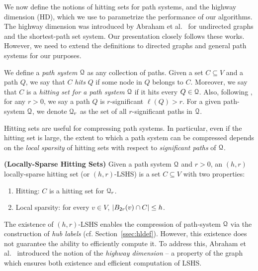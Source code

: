 
We now define the notions of hitting sets for path systems, and the highway dimension (HD), which we use to parametrize the performance of our algorithms. The highway dimension was introduced by Abraham et al.~\cite{highway2013,highway2010} for undirected graphs and the shortest-path set system. 
Our presentation closely follows these works.
However, we need to extend the definitions to directed graphs and general path systems for our purposes. 

We define a \emph{path system} $\calQ$ as any collection of paths.
Given a set $C\subseteq V$ and a path $Q$, we say that $C$ \emph{hits} $Q$ if some node in $Q$ belongs to $C$. Moreover, we say that $C$ is a \emph{hitting set for a path system} $\calQ$ if it hits every $Q\in\calQ$. Also, following \cite{highway2013}, for any $r>0$, we say a path $Q$ is $r$-significant $\ell(Q)>r$. For a given path-system $\calQ$, we denote $\calQ_r$ as the set of all $r$-significant paths in $\calQ$.

Hitting sets are useful for compressing path systems. In particular, even if the hitting set is large, the extent to which a path system can be compressed depends on the \emph{local sparsity} of hitting sets with respect to \emph{significant paths} of $\calQ$.

\begin{definition}
\label{def:lshs}
\textbf{(Locally-Sparse Hitting Sets)} Given a path system $\calQ$ and $r>0$, an $(h,r)$ locally-sparse hitting set (or $(h,r)$-LSHS) is a set $C\subseteq V$ with two properties: 
\begin{enumerate}[nosep]
\item Hitting: $C$ is a hitting set for $\calQ_r$.
\item Local sparsity: for every $v\in V$, $\abs*{B_{2r}(v)\cap C}\leq h$.
\end{enumerate}
\end{definition}


The existence of $(h,r)$-LSHS enables the compression of path-system $\calQ$ via the construction of \emph{hub labels} (cf. Section~\ref{ssec:hldef}). However, this existence does not guarantee the ability to efficiently compute it. 
To address this, Abraham et al.~\cite{highway2013} introduced the notion of the \emph{highway dimension} -- a property of the graph which ensures both existence and efficient computation of LSHS. 


